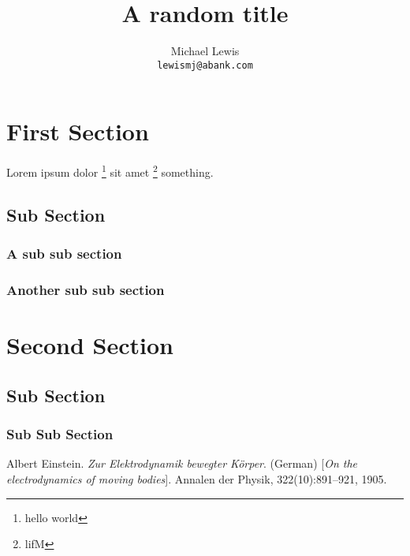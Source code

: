\documentclass[twocolumn]{article}
\title{A random title}
\author{Michael Lewis\\
{\tt\small lewismj@abank.com}
}
\begin{document}
\maketitle

\begin{abstract}
\lipsum[1-1]
\end{abstract}

\tableofcontents

\section{First Section}
 Lorem ipsum dolor \footnote {hello world} sit amet
 \footnote{lifM} something.
	\lipsum[1-2]
	\subsection{Sub Section}
		\subsubsection{A sub sub section}
			\lipsum[1-1]
	\subsubsection{Another sub sub section}
		\lipsum[1-1]
\section{Second Section}
	\subsection{Sub Section}
		\subsubsection{Sub Sub Section}
			\lipsum[1-5]
			
\begin{thebibliography}{9}

Albert Einstein. 
\textit{Zur Elektrodynamik bewegter K{\"o}rper}. (German) 
[\textit{On the electrodynamics of moving bodies}]. 
Annalen der Physik, 322(10):891–921, 1905.

 \end{thebibliography}
\end{document}
